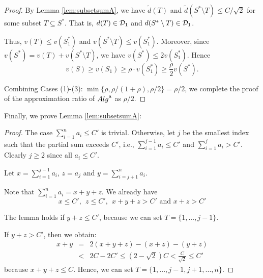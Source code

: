\begin{proof}
By Lemma \ref{lem:subsetsumA}, we have $\tilde{d}(T)$ and $\tilde{d}({S^{\ast}\setminus T}) \le  C/\sqrt{2}$ for some subset $T \subseteq S^\ast$. That is, $d(T)  \in {\cal D}_1$ and $d({S^\ast\setminus T}) \in {\cal D}_1$.

Thus, $v(T) \le  v({S_1^\ast})$ and $v({S^\ast\setminus T}) \le  v({S_1^\ast})$.  Moreover, since $v({S^\ast})=v(T)+v({S^\ast\setminus T})$, we have $v({S^\ast}) \le  2v({S_1^\ast})$.  Hence  
\begin{equation*}
v(S) \ge v(S_1)\ge  \rho \cdot v(S_1^\ast)\ge\frac{\rho}{2} v({S^\ast}).
\end{equation*}

Combining Cases (1)-(3): $\min\{\rho, \rho/(1+\rho), \rho/2 \} = \rho/2$, we complete the proof of the approximation ratio of ${\sc Alg}^{\rm a}$ as $\rho/2$.
\end{proof}

Finally, we prove Lemma \ref{lem:subsetsumA}:

\begin{proof} 
The case $\sum_{i=1}^{n} a_i\leq C'$ is trivial.  Otherwise, 
let $j$ be the smallest index such that the partial sum exceeds $C'$, i.e., $\sum_{i=1}^{j-1} a_i \le  C'$ and $\sum_{i=1}^{j} a_i>C'$.  Clearly $j \ge 2$ since all $a_i \le  C'$.

Let $x=\sum_{i=1}^{j-1} a_i$, $z=a_j$ and $y = \sum_{i=j+1}^{n} a_i$.  

Note that $\sum_{i = 1}^{n} a_i = x+y+z$.  We already have 
\begin{equation*}
x \le  C',\ \ z \le  C',\ \ 
x+y+z > C' \mbox{\ \ and\ \ } x+z > C'
\end{equation*}

The lemma holds if $y+z \le  C'$, because we can set $T = \{1 ,..., j-1 \}$.  

If $y+z> C'$, then we obtain:
\begin{eqnarray*}
x+y & = & 2(x+y+z)-(x+z)-(y+z)  \\
& < & 2C-2C'\le  (2-\sqrt{2})C  < \frac{C}{\sqrt{2}}\le C'
\end{eqnarray*}
because $x+y+z \le  C$.
Hence, we can set $T = \{1 ,..., j-1, j+1, ..., n\}$.  
\end{proof}
\fi